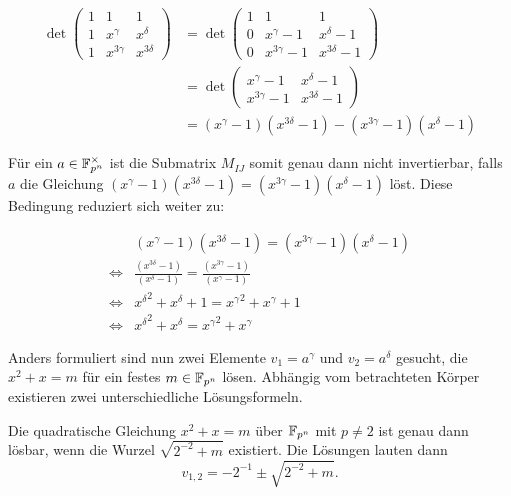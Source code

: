 \begin{align*}
    \det \begin{pmatrix}
        1 & 1 & 1 \\
        1 & x^{\gamma} & x^{\delta} \\
        1 & x^{3\gamma} & x^{3\delta}
    \end{pmatrix}
    &= \det \begin{pmatrix}
        1 & 1 & 1 \\
        0 & x^{\gamma} -1 & x^{\delta} -1 \\
        0 & x^{3\gamma} -1 & x^{3\delta} -1
    \end{pmatrix} \\
    &= \det \begin{pmatrix}
        x^{\gamma} -1 & x^{\delta} -1 \\
        x^{3\gamma} -1 & x^{3\delta} -1
    \end{pmatrix} \\
    &= (x^{\gamma} -1)(x^{3\delta} -1) - (x^{3\gamma} -1)(x^{\delta} -1)
\end{align*}

Für ein $a \in \field{p}[n]^\times$ ist die Submatrix $M_{IJ}$ somit genau dann nicht invertierbar, falls $a$ die Gleichung $(x^{\gamma} -1)(x^{3\delta} -1) = (x^{3\gamma} -1)(x^{\delta} -1)$ löst. Diese Bedingung reduziert sich weiter zu:

\begin{align}
        & (x^{\gamma} -1)(x^{3\delta} -1) = (x^{3\gamma} -1)(x^{\delta} -1) \nonumber \\
    \iff & \frac{(x^{3\delta} -1)}{(x^{\delta} -1)} = \frac{(x^{3\gamma} -1)}{(x^{\gamma} -1)} \nonumber \\
    \iff & {x^\delta}^2 + x^{\delta} + 1 = {x^{\gamma}}^2 + x^{\gamma} + 1 \nonumber \\
    \iff & {x^\delta}^2 + x^{\delta} = {x^{\gamma}}^2 + x^{\gamma} \label{equation:013}
\end{align}

Anders formuliert sind nun zwei Elemente $v_1 = a^\gamma$ und $v_2 = a^\delta$ gesucht, die $x^2 + x = m$ für ein festes $m \in \field{p}[n]$ lösen. Abhängig vom betrachteten Körper existieren zwei unterschiedliche Lösungsformeln.

\begin{lemma}
    Die quadratische Gleichung $x^2 + x = m$ über $\field{p}[n]$ mit $p\neq 2$ ist genau dann lösbar, wenn die Wurzel $\sqrt{2^{-2} + m}$ existiert. Die Lösungen lauten dann
    \begin{equation*}
        v_{1,2} = -2^{-1} \pm \sqrt{2^{-2} + m}.
    \end{equation*}
\end{lemma}

